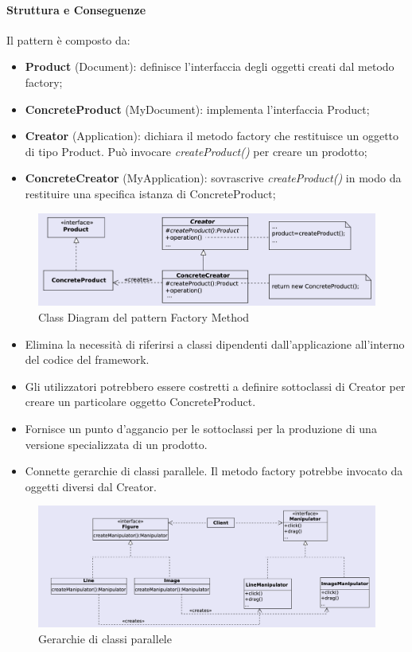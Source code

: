 \paragraph{Struttura e Conseguenze} Il pattern è composto da:
\begin{itemize}
    \item \textbf{Product} (Document): definisce l'interfaccia degli oggetti creati dal metodo factory;
    \item \textbf{ConcreteProduct} (MyDocument): implementa l'interfaccia Product;
    \item \textbf{Creator} (Application): dichiara il metodo factory che restituisce un oggetto di tipo Product. Può invocare \textit{createProduct()} per creare un prodotto;
    \item \textbf{ConcreteCreator} (MyApplication): sovrascrive \textit{createProduct()} in modo da restituire una specifica istanza di ConcreteProduct;
\end{itemize}


\begin{figure}[H]
    \centering
    \includegraphics[width=1\linewidth]{assets/pattern/factory-method/factory-method-struttura.png}
    \caption{Class Diagram del pattern Factory Method}
\end{figure}

\begin{itemize}
    \item Elimina la necessità di riferirsi a classi dipendenti dall’applicazione all’interno del codice del framework.
    \item Gli utilizzatori potrebbero essere costretti a definire sottoclassi di Creator per creare un particolare oggetto ConcreteProduct.
    \item Fornisce un punto d’aggancio per le sottoclassi per la produzione di una versione specializzata di un prodotto.
    \item Connette gerarchie di classi parallele. Il metodo factory potrebbe invocato da oggetti diversi dal Creator.
\end{itemize}

\begin{figure}[H]
    \centering
    \includegraphics[width=0.8\linewidth]{assets/pattern/factory-method/factory-method-parallelo.png}
    \caption{Gerarchie di classi parallele}
\end{figure}

